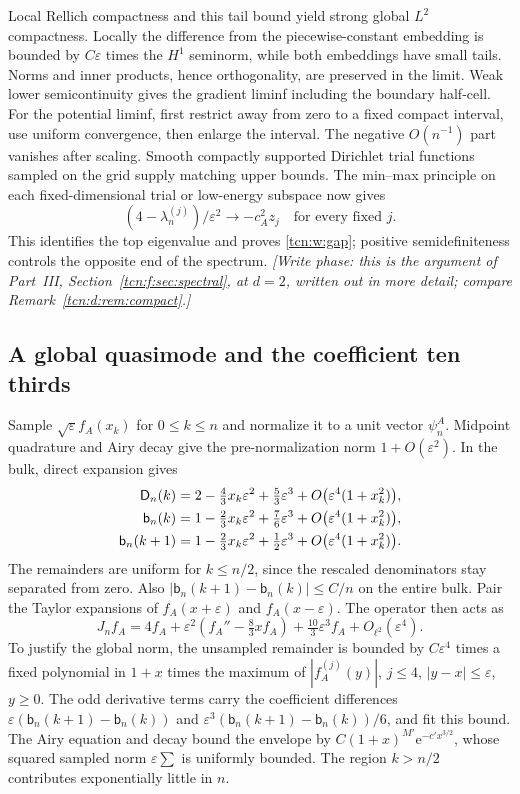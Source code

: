 \documentclass[11pt,letterpaper]{article}
\newcommand{\eps}{\varepsilon}
\newcommand{\ee}{\mathrm e}
\theoremstyle{remark}
\begin{document}
Local Rellich compactness and this tail bound yield strong global $L^2$ compactness. Locally the difference from the piecewise-constant embedding is bounded by $C\eps$ times the $H^1$ seminorm, while both embeddings have small tails. Norms and inner products, hence orthogonality, are preserved in the limit. Weak lower semicontinuity gives the gradient liminf including the boundary half-cell. For the potential liminf, first restrict away from zero to a fixed compact interval, use uniform convergence, then enlarge the interval. The negative $O(n^{-1})$ part vanishes after scaling. Smooth compactly supported Dirichlet trial functions sampled on the grid supply matching upper bounds. The min--max principle on each fixed-dimensional trial or low-energy subspace now gives
\begin{equation}\label{tcn:w:minmax}
 (4-\lambda_n^{(j)})/\eps^2\longrightarrow -c_A^2z_j
 \quad\text{for every fixed }j.
\end{equation}
This identifies the top eigenvalue and proves \eqref{tcn:w:gap}; positive semidefiniteness controls the opposite end of the spectrum. \emph{[Write phase: this is the argument of Part~III, Section~\ref{tcn:f:sec:spectral}, at $d=2$, written out in more detail; compare Remark~\ref{tcn:d:rem:compact}.]}

\subsection{A global quasimode and the coefficient ten thirds}
Sample $\sqrt\eps f_A(x_k)$ for $0\le k\le n$ and normalize it to a unit vector $\psi^A_n$. Midpoint quadrature and Airy decay give the pre-normalization norm $1+O(\eps^2)$. In the bulk, direct expansion gives
\begin{align}
 \mathsf D_n(k)&=2-\tfrac43x_k\eps^2+\tfrac53\eps^3
                  +O\bigl(\eps^4(1+x_k^2)\bigr),\notag\\
 \mathsf b_n(k)&=1-\tfrac23x_k\eps^2+\tfrac76\eps^3
                  +O\bigl(\eps^4(1+x_k^2)\bigr),\label{tcn:w:expansions}\\
 \mathsf b_n(k+1)&=1-\tfrac23x_k\eps^2+\tfrac12\eps^3
                  +O\bigl(\eps^4(1+x_k^2)\bigr).\notag
\end{align}
The remainders are uniform for $k\le n/2$, since the rescaled denominators stay separated from zero. Also $|\mathsf b_n(k+1)-\mathsf b_n(k)|\le C/n$ on the entire bulk. Pair the Taylor expansions of $f_A(x+\eps)$ and $f_A(x-\eps)$. The operator then acts as
\[
 J_nf_A=4f_A+\eps^2(f_A''-\tfrac83xf_A)+\tfrac{10}{3}\eps^3f_A
                   +O_{\ell^2}(\eps^4).
\]
To justify the global norm, the unsampled remainder is bounded by $C\eps^4$ times a fixed polynomial in $1+x$ times the maximum of $|f_A^{(j)}(y)|$, $j\le4$, $|y-x|\le\eps$, $y\ge0$. The odd derivative terms carry the coefficient differences $\eps(\mathsf b_n(k+1)-\mathsf b_n(k))$ and $\eps^3(\mathsf b_n(k+1)-\mathsf b_n(k))/6$, and fit this bound. The Airy equation and decay bound the envelope by $C(1+x)^{M'}\ee^{-c'x^{3/2}}$, whose squared sampled norm $\eps\sum$ is uniformly bounded. The region $k>n/2$ contributes exponentially little in $n$.
\end{document}
